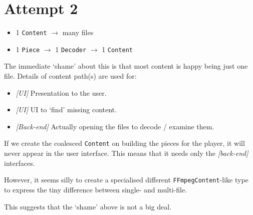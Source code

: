 \documentclass{article}
\begin{document}
\section{Attempt 2}

\begin{itemize}
\item 1 \texttt{Content} $\to$ many files
\item 1 \texttt{Piece} $\to$ 1 \texttt{Decoder} $\to$ 1 \texttt{Content}
\end{itemize}

The immediate `shame' about this is that most content is happy being
just one file.  Details of content path(s) are used for:

\begin{itemize}
\item \emph{[UI]} Presentation to the user.
\item \emph{[UI]} UI to `find' missing content.
\item \emph{[Back-end]} Actually opening the files to decode / examine them.
\end{itemize}

If we create the coalesced \texttt{Content} on building the pieces for
the player, it will never appear in the user interface.  This means
that it needs only the \emph{[back-end]} interfaces.

However, it seems silly to create a specialised different
\texttt{FFmpegContent}-like type to express the tiny difference
between single- and multi-file.

This suggests that the `shame' above is not a big deal.
\end{document}
